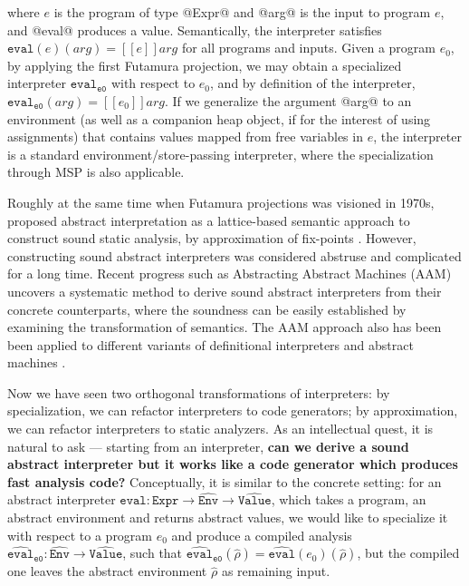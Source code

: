where $e$ is the program of type @Expr@ and @arg@ is the input to program $e$,
and @eval@ produces a value.
Semantically, the interpreter satisfies $ \texttt{eval}(e)(arg) = [\![ e ]\!] arg$ for all
programs and inputs. Given a program $e_0$, by applying the first Futamura
projection, we may obtain a specialized interpreter
$\texttt{eval}_{\texttt{e0}}$ with respect to $e_0$, and by definition of the interpreter, 
$\texttt{eval}_{\texttt{e0}}(arg) = [\![ e_0 ]\!] arg $. If we generalize the
argument @arg@ to an environment (as well as a companion heap object, if for the
interest of using assignments) that contains values mapped from free variables
in $e$, the interpreter is a standard environment/store-passing interpreter,
where the specialization through MSP is also applicable.

Roughly at the same time when Futamura projections was visioned in 1970s,
\citeauthor{DBLP:conf/popl/CousotC77} proposed abstract interpretation as a
lattice-based semantic approach to construct sound static analysis, by
approximation of fix-points \cite{DBLP:conf/popl/CousotC77}. However,
constructing sound abstract interpreters was considered abstruse and complicated
for a long time.
Recent progress such as Abstracting Abstract Machines (AAM)
uncovers a systematic method to derive sound abstract interpreters from their
concrete counterparts, where the soundness can be easily established by
examining the transformation of semantics.
The AAM approach also has been been applied to different variants of
definitional interpreters and abstract machines \cite{DBLP:journals/jfp/HornM12,
DBLP:conf/icfp/HornM10, DBLP:journals/pacmpl/DaraisLNH17}.

Now we have seen two orthogonal transformations of interpreters: by
specialization, we can refactor interpreters to code generators; by approximation,
we can refactor interpreters to static analyzers. As an intellectual quest, it
is natural to ask --- starting from an interpreter, \textbf{can we derive a
sound abstract interpreter but it works like a code generator which produces fast
analysis code?} Conceptually, it is similar to the concrete setting: for an
abstract interpreter $\widehat{\texttt{eval}}: \texttt{Expr} \to
\widehat{\texttt{Env}} \to \widehat{\texttt{Value}}$, which takes a program, an abstract
environment and returns abstract values, we would like to specialize it with
respect to a program $e_0$ and produce a compiled analysis
$\widehat{\texttt{eval}}_{\texttt{e0}} : \widehat{\texttt{Env}} \to
\widehat{\texttt{Value}}$, such that $
\widehat{\texttt{eval}}_{\texttt{e0}}(\widehat{\rho}) =
\widehat{\texttt{eval}}(e_0)(\widehat{\rho})$, but the compiled one leaves the
abstract environment $\widehat{\rho}$ as remaining input.

